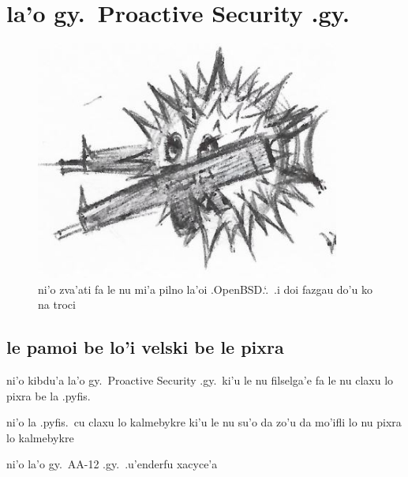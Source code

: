 \documentclass{report}
\newcommand\sds{\spacefactor\sfcode`.\ \space}
\begin{document}
\chapter{la'o gy.\ Proactive Security .gy.}
\begin{figure}[ht]
	\centering
	\includegraphics[width=10cm]{proactivesecurity/proactivesecurity.png}
	\caption[center]{ni'o zva'ati fa le nu mi'a pilno la'oi .OpenBSD.\sds  .i doi fazgau do'u ko na troci}
\end{figure}
\section{le pamoi be lo'i velski be le pixra}
ni'o kibdu'a la'o gy.\ Proactive Security .gy.\ ki'u le nu filselga'e fa le nu claxu lo pixra be la .pyfis.

ni'o la .pyfis.\ cu claxu lo kalmebykre ki'u le nu su'o da zo'u da mo'ifli lo nu pixra lo kalmebykre

ni'o la'o gy.\ AA-12 .gy.\ .u'enderfu xacyce'a
\end{document}
